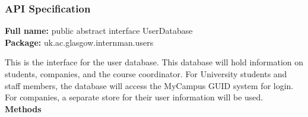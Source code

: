 \documentclass[11pt]{l3deliverable}
\begin{document}
\subsubsection{API Specification}

\textbf{Full name:} public abstract interface UserDatabase\\

\textbf{Package:} uk.ac.glasgow.internman.users

This is the interface for the user database. This database will hold information
on students, companies, and the course coordinator. For University students and
staff members, the database will access the MyCampus GUID system for login. For
companies, a separate store for their user information will be used.\\

\textbf{Methods}
\end{document}
